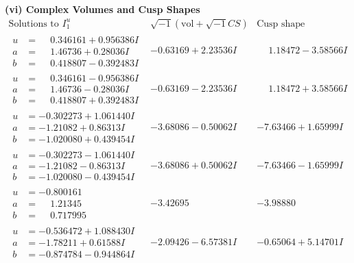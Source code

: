 \documentclass[1p]{elsarticle_modified}
\theoremstyle{definition}
\newcommand{\I}{\sqrt{-1}}
\begin{document}
\newpage\flushleft \textbf{(vi) Complex Volumes and Cusp Shapes}
$$\begin{array}{c|c|c}  
\text{Solutions to }I^u_{1}& \I (\text{vol} + \sqrt{-1}CS) & \text{Cusp shape}\\
 \hline 
\begin{aligned}
u &= \phantom{-}0.346161 + 0.956386 I \\
a &= \phantom{-}1.46736 + 0.28036 I \\
b &= \phantom{-}0.418807 - 0.392483 I\end{aligned}
 & -0.63169 + 2.23536 I & \phantom{-}1.18472 - 3.58566 I \\ \hline\begin{aligned}
u &= \phantom{-}0.346161 - 0.956386 I \\
a &= \phantom{-}1.46736 - 0.28036 I \\
b &= \phantom{-}0.418807 + 0.392483 I\end{aligned}
 & -0.63169 - 2.23536 I & \phantom{-}1.18472 + 3.58566 I \\ \hline\begin{aligned}
u &= -0.302273 + 1.061440 I \\
a &= -1.21082 + 0.86313 I \\
b &= -1.020080 + 0.439454 I\end{aligned}
 & -3.68086 - 0.50062 I & -7.63466 + 1.65999 I \\ \hline\begin{aligned}
u &= -0.302273 - 1.061440 I \\
a &= -1.21082 - 0.86313 I \\
b &= -1.020080 - 0.439454 I\end{aligned}
 & -3.68086 + 0.50062 I & -7.63466 - 1.65999 I \\ \hline\begin{aligned}
u &= -0.800161\phantom{ +0.000000I} \\
a &= \phantom{-}1.21345\phantom{ +0.000000I} \\
b &= \phantom{-}0.717995\phantom{ +0.000000I}\end{aligned}
 & -3.42695\phantom{ +0.000000I} & -3.98880\phantom{ +0.000000I} \\ \hline\begin{aligned}
u &= -0.536472 + 1.088430 I \\
a &= -1.78211 + 0.61588 I \\
b &= -0.874784 - 0.944864 I\end{aligned}
 & -2.09426 - 6.57381 I & -0.65064 + 5.14701 I \\ \hline\begin{aligned}

\end{aligned}
\end{array}$$
\end{document}

